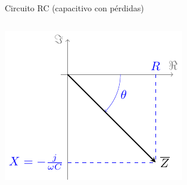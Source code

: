 \documentclass[aspectratio=169, usenames,svgnames,dvipsnames]{beamer}
\begin{document}
\begin{frame}{Circuito RC \hspace{3mm}(capacitivo con pérdidas)}
\begin{columns}
    \begin{column}{0.55\columnwidth}
        \vspace{10mm}
        \begin{center}
            \includegraphics[width=.85\linewidth]{../figs/fasorCondensadorReal.pdf}
        \end{center}
    \end{column}
    \end{columns}
\end{frame}

\end{document}
